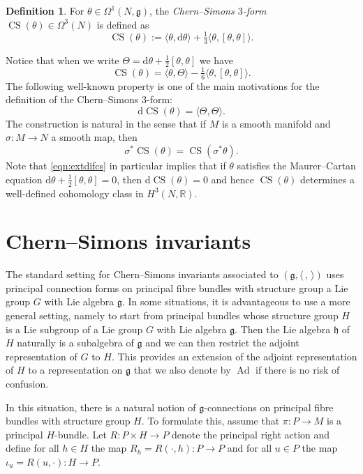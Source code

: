 \documentclass[british,11pt,a4paper]{amsart}
\numberwithin{equation}{section}
\renewcommand\frak{\mathfrak}
\renewcommand{\th}{\theta}
\newcommand{\deq}{:=}
\newcommand{\Om}{\Omega}
\newcommand{\B}[2]{\langle#1,#2\rangle}
\newcommand{\CS}{\operatorname{CS}}
\newcommand{\Ad}{\operatorname{Ad}}
\renewcommand*{\d}{\mathrm{d}}
\newcommand*{\R}{\mathbb{R}}
\newcommand{\col}{:}
\newcounter{theorem}
\numberwithin{theorem}{section}
\theoremstyle{definition}
\newtheorem{definition}[theorem]{Definition}
\theoremstyle{remark}
\begin{document}
\begin{definition}\label{def:CS}
For $\theta\in\Om^1(N,\frak{g})$, the \textit{Chern--Simons $3$-form} $\CS(\th)\in\Om^3(N)$ is defined as
\[
\CS(\th)\deq\B{\th}{\d\th}+\tfrac13 \B{\th}{[\th,\th]}. 
\]
\end{definition}
Notice that when we write $\Theta=\d\theta+\frac{1}{2}[\theta,\theta]$ we have
\[
\CS(\theta)=\B{\theta}{\Theta}-\tfrac{1}{6}\B{\theta}{[\theta,\theta]}.
\]
The following well-known property is one of the main motivations for the definition of
the Chern--Simons $3$-form: 
\begin{equation}\label{eqn:extdifcs}\d\CS(\th)=\B{\Theta}{\Theta}.\end{equation} 
The construction is natural in the sense that if $M$ is a smooth manifold
and $\sigma \col M \to N$ a smooth map, then
\begin{equation}\label{eqn:cspullback}
\sigma^*\CS(\theta)=\CS(\sigma^*\theta).
\end{equation}
Note that \eqref{eqn:extdifcs} in particular implies that if $\th$ satisfies the Maurer--Cartan equation $\d\th+\frac12[\th,\th]=0$, then $\d\CS(\th)=0$ and hence $\CS(\th)$ determines a well-defined cohomology class in $H^3(N,\R)$.

\section{Chern--Simons invariants}\label{1.3}

The standard setting for Chern--Simons invariants associated to $(\frak g,\B{\,}{\,})$ uses principal connection forms on principal fibre bundles with structure group a Lie group $G$ with Lie algebra $\frak{g}$. In some situations, it is advantageous to use a more general setting, namely to start from principal bundles whose structure group $H$ is a Lie subgroup of a Lie group $G$ with Lie algebra $\frak g$. Then the Lie algebra $\frak{h}$ of $H$ naturally is a subalgebra of $\frak{g}$ and we can then restrict the adjoint representation of $G$ to $H$. This provides an extension of the adjoint representation of $H$ to a representation on $\frak{g}$ that we also denote by $\Ad$ if there is no risk of confusion.

In this situation, there is a natural notion of $\frak{g}$-connections on principal
fibre bundles with structure group $H$. To formulate this, assume that $\pi\col
P\to M$ is a principal $H$-bundle. Let $R \col P \times H \to P$ denote the
principal right action and define for all $h \in H$ the map $R_h=R(\cdot,h) \col P
\to P$ and for all $u \in P$ the map
$\iota_u=R(u,\cdot) \col H \to P$.
\end{document}
